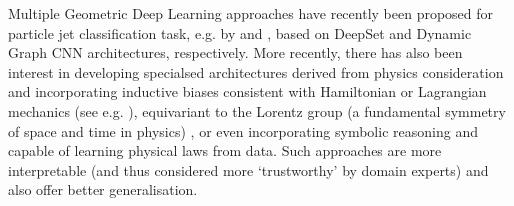 Multiple Geometric Deep Learning approaches have recently been proposed for particle jet classification task, e.g. by \cite{komiske2019energy} and \cite{qu1902particlenet},  based on DeepSet and Dynamic Graph CNN architectures, respectively. 
%
More recently, there has also been interest in developing specialsed architectures derived from physics consideration and incorporating inductive biases consistent with Hamiltonian or Lagrangian mechanics (see e.g. \cite{sanchez2019hamiltonian,cranmer2020lagrangian}), equivariant to the Lorentz group (a fundamental symmetry of space and time in physics) \citep{bogatskiy2020lorentz}, or even incorporating symbolic reasoning \citep{cranmer2019learning} and capable of learning physical laws from data. Such approaches are more interpretable (and thus considered more `trustworthy' by domain experts) and also offer better generalisation. 



